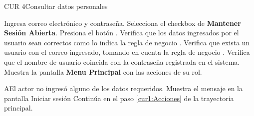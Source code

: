 \begin{UseCase}{CUR 4}{Consultar datos personales}
{\begin{UClist}
		\end{UClist}		
	}

 \end{UseCase}

 \begin{UCtrayectoria}
 	
 	\UCpaso [\UCactor] Ingresa correo electrónico y contraseña.
 	\UCpaso [\UCactor] Selecciona el checkbox de \textbf{Mantener Sesión Abierta}.
 	\UCpaso [\UCactor] Presiona el botón .
 	\UCpaso [\UCsist] Verifica que los datos ingresados por el usuario sean correctos como lo indica la regla de negocio . 
 	\UCpaso[\UCsist] Verifica que exista un usuario con el correo ingresado, tomando en cuenta la regla de negocio .  
 	\UCpaso[\UCsist] Verifica que el nombre de usuario coincida con la contraseña registrada en el sistema. 
 	\UCpaso[\UCsist] Muestra la pantalla \textbf{Menu Principal} con las acciones de su rol.
 	
    
 \end{UCtrayectoria}

 \begin{UCtrayectoriaA}{A}{El actor no ingresó alguno de los datos requeridos.}
    \UCpaso[\UCsist] Muestra el mensaje  en la pantalla \textbf{}{Iniciar sesión}
   \UCpaso[] Continúa en el paso \ref{cur1:Acciones} de la trayectoria principal.
 \end{UCtrayectoriaA}
 

